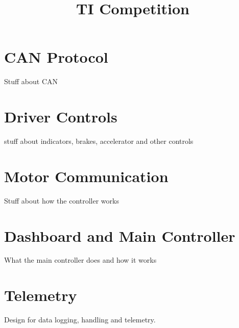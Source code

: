 \documentclass[10pt,a4paper]{article}
\begin{document}
\title{TI Competition}
\maketitle
\tableofcontents
\section{CAN Protocol}
Stuff about CAN

\section{Driver Controls}
stuff about indicators, brakes, accelerator and other controls

\section{Motor Communication}
Stuff about how the controller works

\section{Dashboard and Main Controller}
What the main controller does and how it works

\section{Telemetry}
Design for data logging, handling and telemetry.
\end{document}
